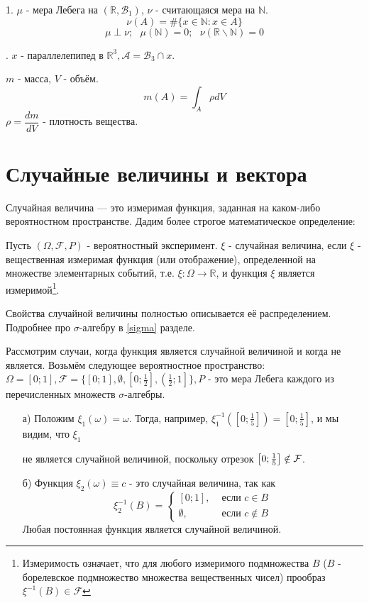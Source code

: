 \begin{exmp}
	1. $\mu$ - мера Лебега на $(\mathbb{R}, \mathcal{B}_1)$, $\nu$ - считающаяся мера на $\mathbb{N}$.
	\[ \nu (A) = \# \{ x \in \mathbb{N} : x \in A \} \]
	\[ \mu \perp \nu; ~~~ \mu (\mathbb{N}) = 0; ~~~ \nu (\mathbb{R} \backslash \mathbb{N}) = 0 \]
	
	. $x$ - параллелепипед в $\mathbb{R}^3, \mathcal{A} = \mathcal{B}_3 \cap x$.
	
	\noindent $m$ - масса, $V$ - объём.
	\[ m(A) = \int_A \rho dV \]
	\noindent $\rho = \dfrac{dm}{dV}$ - плотность вещества. 
\end{exmp}

\section{Случайные величины и вектора}

\begin{definition}
	Случайная величина — это измеримая функция, заданная на каком-либо вероятностном пространстве. Дадим более строгое математическое определение:
	
	Пусть $(\Omega, \mathcal{F}, P)$ - вероятностный эксперимент. $\xi$ - случайная величина, если $\xi$ - вещественная измеримая функция (или отображение), определенной на множестве элементарных событий, т.е. $\xi: \Omega \to \mathbb{R}$, и функция $\xi$ является измеримой\footnote{Измеримость означает, что для любого измеримого подмножества $B$ ($B$ - борелевское подмножество множества вещественных чисел) прообраз $\xi^{-1} (B) \in \mathcal{F}$}.
\end{definition}
\begin{remark}
	Свойства случайной величины полностью описывается её распределением. Подробнее про $\sigma$-алгебру в \ref{sigma} разделе.
\end{remark}

\begin{exmp}
	Рассмотрим случаи, когда функция является случайной величиной и когда не является. Возьмём следующее вероятностное пространство: $\Omega = [0; 1], \mathcal{F} = \{ [0;1], \emptyset, \left[ 0; \frac{1}{2} \right], \left( \frac{1}{2}; 1 \right] \}, P$ - это мера Лебега каждого из перечисленных множеств $\sigma$-алгебры.
	\begin{enumerate}
		\item[а)] Положим $\xi_1 (\omega) = \omega$. Тогда, например, $\xi_{1}^{-1} \left( \left[ 0; \frac{1}{5} \right] \right) = \left[ 0; \frac{1}{5} \right]$, и мы видим, что $\xi_1$
		
		не является случайной величиной, поскольку отрезок $\left[ 0; \frac{1}{5} \right] \notin {\mathcal F}$.
		\item[б)] Функция $\xi_2 (\omega) \equiv c$ - это случайная величина, так как
		\[
		\xi_{2}^{-1} (B) =
		\begin{cases}
			[0;1], & \text{ если } c \in B \\
			\emptyset, & \text{ если } c \notin B
		\end{cases}
		\]
		Любая постоянная функция является случайной величиной.
	\end{enumerate}
\end{exmp}

